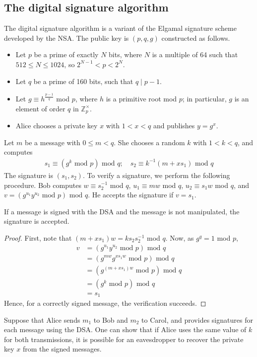 \subsection{The digital signature algorithm}
The digital signature algorithm is a variant of the Elgamal signature scheme developed by the NSA.
The public key is $(p, q, g)$ constructed as follows.
\begin{itemize}
    \item Let $p$ be a prime of exactly $N$ bits, where $N$ is a multiple of 64 such that $512 \leq N \leq 1024$, so $2^{N-1} < p < 2^N$.
    \item Let $q$ be a prime of 160 bits, such that $q \mid p-1$.
    \item Let $g \equiv h^{\frac{p-1}{q}}$ mod $p$, where $h$ is a primitive root mod $p$; in particular, $g$ is an element of order $q$ in $\mathbb Z_p^\times$.
    \item Alice chooses a private key $x$ with $1 < x < q$ and publishes $y = g^x$.
\end{itemize}
Let $m$ be a message with $0 \leq m < q$.
She chooses a random $k$ with $1 < k < q$, and computes
\begin{align*}
    s_1 \equiv (g^k \text{ mod } p) \text{ mod } q;\quad s_2 \equiv k^{-1}(m+xs_1) \text{ mod } q
\end{align*}
The signature is $(s_1, s_2)$.
To verify a signature, we perform the following procedure.
Bob computes $w \equiv s_2^{-1}$ mod $q$, $u_1 \equiv mw$ mod $q$, $u_2 \equiv s_1 w$ mod $q$, and $v = (g^{u_1} y^{u_2} \text{ mod } p) \text{ mod } q$.
He accepts the signature if $v = s_1$.
\begin{proposition}
    If a message is signed with the DSA and the message is not manipulated, the signature is accepted.
\end{proposition}
\begin{proof}
    First, note that $(m + xs_1)w = ks_2s_2^{-1}$ mod $q$.
    Now, as $g^q = 1$ mod $p$,
    \begin{align*}
        v &= (g^{u_1} y^{u_2} \text{ mod } p) \text{ mod } q \\
        &= (g^{mw} g^{xs_1 w} \text{ mod } p) \text{ mod } q \\
        &= (g^{(m + xs_1)w} \text{ mod } p) \text{ mod } q \\
        &= (g^k \text{ mod } p) \text{ mod } q \\
        &= s_1
    \end{align*}
    Hence, for a correctly signed message, the verification succeeds.
\end{proof}
Suppose that Alice sends $m_1$ to Bob and $m_2$ to Carol, and provides signatures for each message using the DSA.
One can show that if Alice uses the same value of $k$ for both transmissions, it is possible for an eavesdropper to recover the private key $x$ from the signed messages.

